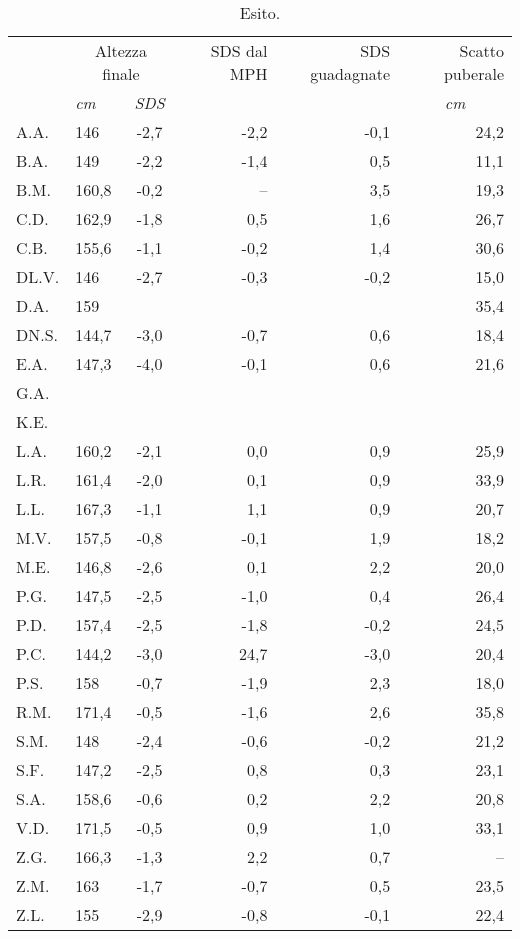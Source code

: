 \begin{table}[!h]
\begin{center}
\begin{tabular}{llcrrr}
\toprule
 & \multicolumn{2}{c}{Altezza finale} 	& SDS dal MPH	& SDS guadagnate & Scatto puberale \\
\cmidrule(r){2-3}
  & \emph{cm} 	& \emph{SDS}  	   	&		& 			 & \multicolumn{1}{c}{\emph{cm}}	\\
\midrule
A.A.	& 146   & -2,7  & -2,2  & -0,1  & 24,2  \\
B.A.	& 149   & -2,2  & -1,4  & 0,5   & 11,1  \\
B.M.	& 160,8 & -0,2  & --    & 3,5   & 19,3  \\
C.D.	& 162,9 & -1,8  & 0,5   & 1,6   & 26,7  \\
C.B.	& 155,6 & -1,1  & -0,2  & 1,4   & 30,6  \\
DL.V.	& 146   & -2,7  & -0,3  & -0,2  & 15,0  \\
D.A.	& 159   &       &       &       & 35,4  \\
DN.S.	& 144,7 & -3,0  & -0,7  & 0,6   & 18,4  \\
E.A.	& 147,3 & -4,0  & -0,1  & 0,6   & 21,6  \\
G.A.	&       &       &       &       &   \\
K.E.	&       &       &       &       &   \\
L.A.	& 160,2 & -2,1  & 0,0   & 0,9   & 25,9  \\
L.R.	& 161,4 & -2,0  & 0,1   & 0,9   & 33,9  \\
L.L.	& 167,3 & -1,1  & 1,1   & 0,9   & 20,7  \\
M.V.	& 157,5 & -0,8  & -0,1  & 1,9   & 18,2  \\
M.E.	& 146,8 & -2,6  & 0,1   & 2,2   & 20,0  \\
P.G.	& 147,5 & -2,5  & -1,0  & 0,4   & 26,4  \\
P.D.	& 157,4 & -2,5  & -1,8  & -0,2  & 24,5  \\
P.C.	& 144,2 & -3,0  & 24,7  & -3,0  & 20,4  \\
P.S.	& 158   & -0,7  & -1,9  & 2,3   & 18,0  \\
R.M.	& 171,4 & -0,5  & -1,6  & 2,6   & 35,8 \\
S.M.	& 148   & -2,4  & -0,6  & -0,2  & 21,2  \\
S.F.	& 147,2 & -2,5  & 0,8   & 0,3   & 23,1  \\
S.A.	& 158,6 & -0,6  & 0,2   & 2,2   & 20,8  \\
V.D.	& 171,5 & -0,5  & 0,9   & 1,0   & 33,1  \\
Z.G.	& 166,3 & -1,3  & 2,2   & 0,7   & --  \\
Z.M.	& 163   & -1,7  & -0,7  & 0,5   & 23,5  \\
Z.L.	& 155   & -2,9  & -0,8  & -0,1  & 22,4  \\
\bottomrule
\end{tabular}
\end{center}
\caption{Esito.}
\label{tab:Esito}
\end{table}

